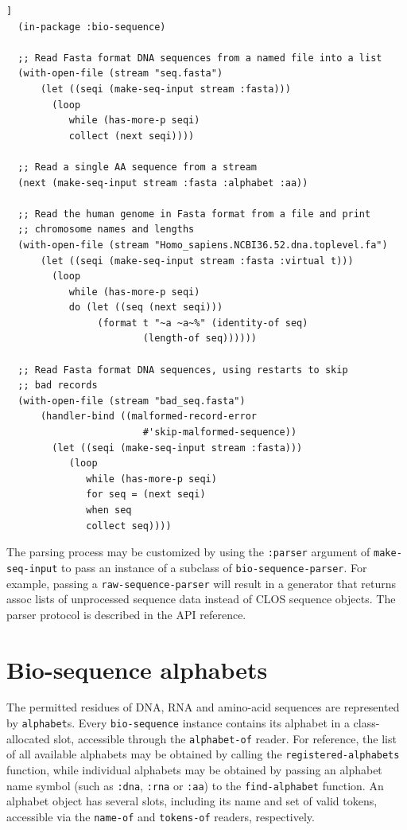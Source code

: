 \documentclass[a4paper, 12pt]{article}
\begin{document}
\begin{lstlisting}[caption={Making sequences from streams},
  label=lst:read-bioseq-stream,float=[tbph]]
  (in-package :bio-sequence)
  
  ;; Read Fasta format DNA sequences from a named file into a list
  (with-open-file (stream "seq.fasta")
      (let ((seqi (make-seq-input stream :fasta)))
        (loop
           while (has-more-p seqi)
           collect (next seqi))))

  ;; Read a single AA sequence from a stream
  (next (make-seq-input stream :fasta :alphabet :aa))

  ;; Read the human genome in Fasta format from a file and print
  ;; chromosome names and lengths
  (with-open-file (stream "Homo_sapiens.NCBI36.52.dna.toplevel.fa")
      (let ((seqi (make-seq-input stream :fasta :virtual t)))
        (loop
           while (has-more-p seqi)
           do (let ((seq (next seqi)))
                (format t "~a ~a~%" (identity-of seq)
                        (length-of seq))))))

  ;; Read Fasta format DNA sequences, using restarts to skip
  ;; bad records
  (with-open-file (stream "bad_seq.fasta")
      (handler-bind ((malformed-record-error
                        #'skip-malformed-sequence))
        (let ((seqi (make-seq-input stream :fasta)))
           (loop
              while (has-more-p seqi)
              for seq = (next seqi)
              when seq
              collect seq))))
\end{lstlisting}

The parsing process may be customized by using the \lstinline!:parser!
argument of \lstinline!make-seq-input! to pass an instance of a
subclass of \lstinline!bio-sequence-parser!. For example, passing a
\lstinline!raw-sequence-parser!  will result in a generator that
returns assoc lists of unprocessed sequence data instead of CLOS
sequence objects. The parser protocol is described in the API
reference.


\section{Bio-sequence alphabets}
\label{sec:alphabet-bioseq}

The permitted residues of DNA, RNA and amino-acid sequences are
represented by \lstinline!alphabet!s. Every \lstinline!bio-sequence!
instance contains its alphabet in a class-allocated slot, accessible
through the \lstinline!alphabet-of! reader. For reference, the list of
all available alphabets may be obtained by calling the
\lstinline!registered-alphabets! function, while individual alphabets
may be obtained by passing an alphabet name symbol (such as
\lstinline!:dna!, \lstinline!:rna! or \lstinline!:aa!) to the
\lstinline!find-alphabet! function. An alphabet object has several
slots, including its name and set of valid tokens, accessible via the
\lstinline!name-of! and \lstinline!tokens-of! readers, respectively.
\end{document}
